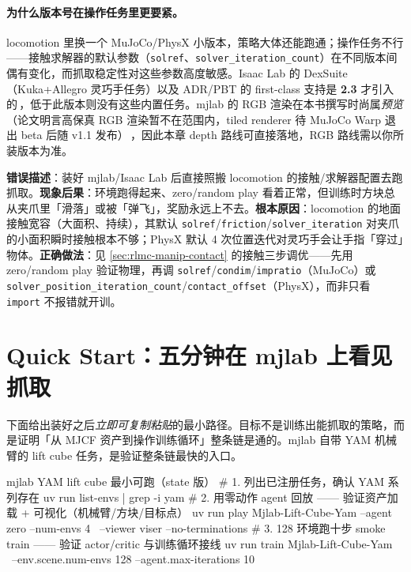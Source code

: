 \paragraph{为什么版本号在操作任务里更要紧。}locomotion 里换一个 MuJoCo/PhysX 小版本，策略大体还能跑通；操作任务不行——接触求解器的默认参数（\verb|solref|、\verb|solver_iteration_count|）在不同版本间偶有变化，而抓取稳定性对这些参数高度敏感。Isaac Lab 的 DexSuite（Kuka+Allegro 灵巧手任务）以及 ADR/PBT 的 first-class 支持是 \textbf{2.3} 才引入的\,\cite{nvidia2025isaaclab23}，低于此版本则没有这些内置任务。mjlab 的 RGB 渲染在本书撰写时尚属\emph{预览}（论文明言高保真 RGB 渲染暂不在范围内，tiled renderer 待 MuJoCo Warp 退出 beta 后随 v1.1 发布）\,\cite{zakka2026mjlab}，因此本章 depth 路线可直接落地，RGB 路线需以你所装版本为准。

\begin{pitfall}
\textbf{错误描述}：装好 mjlab/Isaac Lab 后直接照搬 locomotion 的接触/求解器配置去跑抓取。\textbf{现象后果}：环境跑得起来、zero/random play 看着正常，但训练时方块总从夹爪里「滑落」或被「弹飞」，奖励永远上不去。\textbf{根本原因}：locomotion 的地面接触宽容（大面积、持续），其默认 \verb|solref|/\verb|friction|/\verb|solver_iteration| 对夹爪的小面积瞬时接触根本不够；PhysX 默认 4 次位置迭代对灵巧手会让手指「穿过」物体。\textbf{正确做法}：见 \cref{sec:rlmc-manip-contact} 的接触三步调优——先用 zero/random play 验证物理，再调 \verb|solref|/\verb|condim|/\verb|impratio|（MuJoCo）或 \verb|solver_position_iteration_count|/\verb|contact_offset|（PhysX），而非只看 \verb|import| 不报错就开训。
\end{pitfall}

\section*{Quick Start：五分钟在 mjlab 上看见抓取}
\label{sec:rlmc-manip-quickstart}

下面给出装好之后\emph{立即可复制粘贴}的最小路径。目标不是训练出能抓取的策略，而是证明「从 MJCF 资产到操作训练循环」整条链是通的。mjlab 自带 YAM 机械臂的 lift cube 任务，是验证整条链最快的入口。

\begin{codebox}[bash]{mjlab YAM lift cube 最小可跑（state 版）}
# 1. 列出已注册任务，确认 YAM 系列存在
uv run list-envs | grep -i yam
# 2. 用零动作 agent 回放 —— 验证资产加载 + 可视化（机械臂/方块/目标点）
uv run play Mjlab-Lift-Cube-Yam --agent zero --num-envs 4 \
    --viewer viser --no-terminations
# 3. 128 环境跑十步 smoke train —— 验证 actor/critic 与训练循环接线
uv run train Mjlab-Lift-Cube-Yam \
    --env.scene.num-envs 128 --agent.max-iterations 10
\end{codebox}

